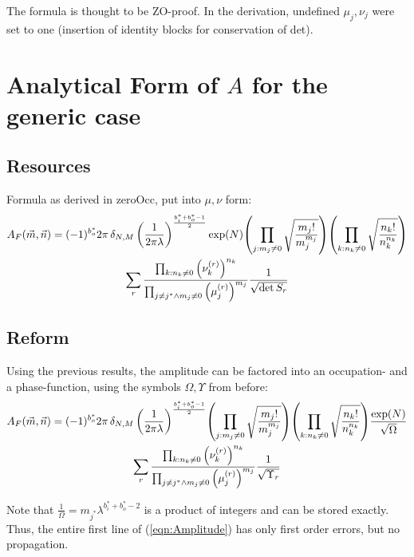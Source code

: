 \documentclass[
	english,
	a4paper,
	fontsize=10pt,
	parskip=half,
	titlepage=true,
	DIV=12,
	final
]{scrreprt}
\begin{document}
The formula is thought to be ZO-proof. In the derivation, undefined $\mu_j, \nu_j$ were set to one (insertion of identity blocks for conservation of det).

\chapter{Analytical Form of $A$ for the generic case}
\section{Resources}
Formula as derived in zeroOcc, put into $\mu, \nu$ form:
\begin{multline}
	A_F(\vec{m}, \vec{n})
=
	(-1)^{b_o^*}
	2\pi \, \delta_{N,M} \, \qty(
		\frac{1}{2\pi\lambda}
	)^{\frac{b_i^* + b_o^* - 1}{2}}
	\exp(N)
	\qty( \prod_{j : m_j \neq 0}
		\sqrt{\frac
			{ m_j! }
			{ m_j^{m_j} }
	})
	\qty( \prod_{k : n_k \neq 0}
		\sqrt{\frac
			{ n_k! }
			{ n_k^{n_k} }
	})
\\
	\sum_r
		\frac
			{\prod_{k             : n_k \neq 0} \qty(\nu_k^{(r)})^{n_k}}
			{\prod_{j\neq j^* \land m_j \neq 0} \qty(\mu_j^{(r)})^{m_j}}
		\frac
			{1}
			{\sqrt{\det S_r}}
\end{multline}

\section{Reform}
Using the previous results, the amplitude can be factored into an occupation- and a phase-function, using the symbols $\Omega, \Upsilon$ from before:
\begin{multline}
	A_F(\vec{m}, \vec{n})
=
	(-1)^{b_o^*}
	2\pi \, \delta_{N,M} \, \qty(
		\frac{1}{2\pi\lambda}
	)^{\frac{b_i^* + b_o^* - 1}{2}}
	\qty( \prod_{j : m_j \neq 0}
		\sqrt{\frac
			{ m_j! }
			{ m_j^{m_j} }
	})
	\qty( \prod_{k : n_k \neq 0}
		\sqrt{\frac
			{ n_k! }
			{ n_k^{n_k} }
	})
	\frac
		{\exp(N)}
		{\sqrt{\Omega}}
\\
	\sum_r
		\frac
			{\prod_{k             : n_k \neq 0} \qty(\nu_k^{(r)})^{n_k}}
			{\prod_{j\neq j^* \land m_j \neq 0} \qty(\mu_j^{(r)})^{m_j}}
		\frac
			{1}
			{\sqrt{\Upsilon_r}}
\label{eqn:Amplitude}
\end{multline}

Note that $\frac{1}{\Omega} = m_{j^*} \lambda^{b_i^* + b_o^* - 2} $ is a product of integers and can be stored exactly. Thus, the entire first line of (\ref{eqn:Amplitude}) has only first order errors, but no propagation.
\end{document}
